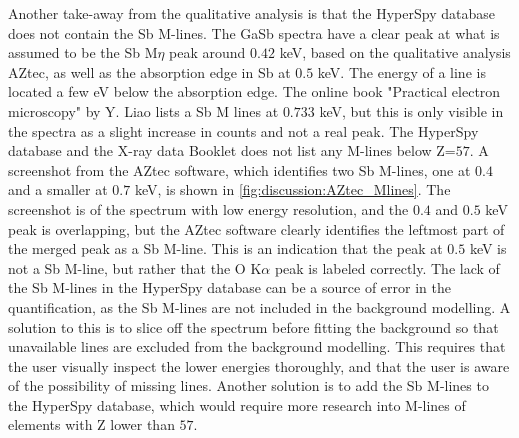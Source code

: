 Another take-away from the qualitative analysis is that the HyperSpy database does not contain the Sb M-lines.
The GaSb spectra have a clear peak at what is assumed to be the Sb M$\eta$ peak around $0.42$ keV, based on the qualitative analysis AZtec, as well as the absorption edge in Sb at $0.5$ keV.
The energy of a line is located a few eV below the absorption edge.
The online book "Practical electron microscopy" by Y. Liao \cite{liao2006practical} lists a Sb M lines at $0.733$ keV, but this is only visible in the spectra as a slight increase in counts and not a real peak.
The HyperSpy database and the X-ray data Booklet \cite{thompson_x-ray_2004} does not list any M-lines below Z=$57$.
A screenshot from the AZtec software, which identifies two Sb M-lines, one at $0.4$ and a smaller at $0.7$ keV, is shown in \cref{fig:discussion:AZtec_Mlines}.
The screenshot is of the spectrum with low energy resolution, and the $0.4$ and $0.5$ keV peak is overlapping, but the AZtec software clearly identifies the leftmost part of the merged peak as a Sb M-line.
This is an indication that the peak at $0.5$ keV is not a Sb M-line, but rather that the O K$\alpha$ peak is labeled correctly.
The lack of the Sb M-lines in the HyperSpy database can be a source of error in the quantification, as the Sb M-lines are not included in the background modelling.
A solution to this is to slice off the spectrum before fitting the background so that unavailable lines are excluded from the background modelling.
This requires that the user visually inspect the lower energies thoroughly, and that the user is aware of the possibility of missing lines.
Another solution is to add the Sb M-lines to the HyperSpy database, which would require more research into M-lines of elements with Z lower than $57$.

